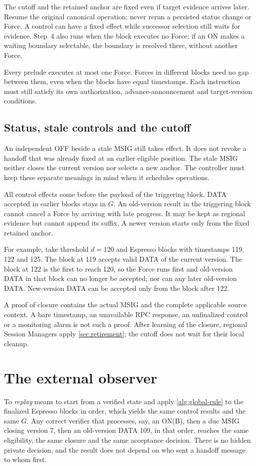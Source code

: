 \documentclass[11pt,a4paper]{article}
\begin{document}
The cutoff and the retained anchor are fixed even if target evidence
arrives later. Resume the original canonical operation; never rerun a
persisted status change or Force. A control can have a fixed effect while
successor selection still waits for evidence. Step~4 also runs when the
block executes no Force: if an ON makes a waiting boundary selectable,
the boundary is resolved there, without another Force.

Every prelude executes at most one Force. Forces in different blocks
need no gap between them, even when the blocks have equal timestamps.
Each instruction must still satisfy its own authorization,
advance-announcement and target-version conditions.

\subsection{Status, stale controls and the cutoff}
An independent OFF beside a stale MSIG still takes effect. It does not
revoke a handoff that was already fixed at an earlier eligible position.
The stale MSIG neither closes the current version nor selects a new
anchor. The controller must keep these separate meanings in mind when it
schedules operations.

All control effects come before the payload of the triggering block.
DATA accepted in earlier blocks stays in $G$. An old-version result in
the triggering block cannot cancel a Force by arriving with late
progress. It may be kept as regional evidence but cannot append its
suffix. A newer version starts only from the fixed retained anchor.

For example, take threshold $d=120$ and Espresso blocks with timestamps
119, 122 and 125. The block at 119 accepts valid DATA of the current
version. The block at 122 is the first to reach 120, so the Force runs
first and old-version DATA in that block can no longer be accepted;
nor can any later old-version DATA. New-version DATA can be accepted only
from the block after 122.

A proof of closure contains the actual MSIG and the complete applicable
source context. A bare timestamp, an unavailable RPC response, an
unfinalized control or a monitoring alarm is not such a proof. After
learning of the closure, regional Session Managers apply
\cref{sec:retirement}; the cutoff does not wait for their local cleanup.

\section{The external observer}
\label{sec:observers}
To \emph{replay} means to start from a verified state and apply
\cref{alg:global-rule} to the finalized Espresso blocks in order, which
yields the same control results and the same $G$. Any correct verifier that processes, say, an
ON(B), then a due MSIG closing version 7, then an old-version DATA 109,
in that order, reaches the same eligibility, the same closure and the
same acceptance decision. There is no hidden private decision, and the
result does not depend on who sent a handoff message to whom first.
\end{document}
